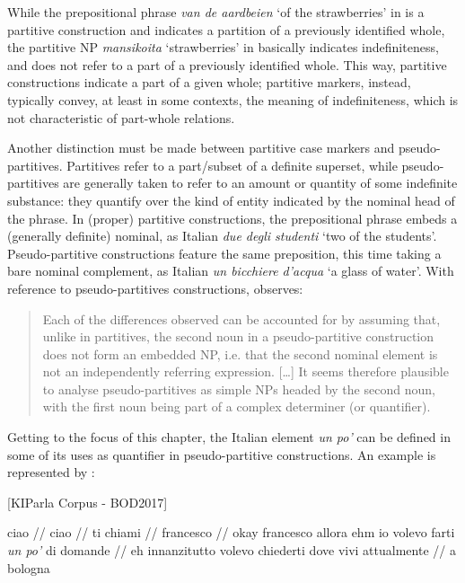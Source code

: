 While the prepositional phrase \textit{van de aardbeien} ‘of the strawberries’ in  is a partitive construction and indicates a partition of a previously identified whole, the partitive NP \textit{mansikoita} ‘strawberries’ in  basically indicates indefiniteness, and does not refer to a part of a previously identified whole. This way, partitive constructions indicate a part of a given whole; partitive markers, instead, typically convey, at least in some contexts, the meaning of indefiniteness, which is not characteristic of part-whole relations.

Another distinction must be made between partitive case markers and pseudo-partitives. Partitives refer to a part/subset of a definite superset, while pseudo-partitives are generally taken to refer to an amount or quantity of some indefinite substance: they quantify over the kind of entity indicated by the nominal head of the phrase. In (proper) partitive constructions, the prepositional phrase embeds a (generally definite) nominal, as Italian \textit{due degli studenti} ‘two of the students’. Pseudo-partitive constructions feature the same preposition, this time taking a bare nominal complement, as Italian \textit{un bicchiere d’acqua} ‘a glass of water’. With reference to pseudo-partitives constructions, \citet{Keizer2007} observes:

\begin{quote}
Each of the differences observed can be accounted for by assuming that, unlike in partitives, the second noun in a pseudo-partitive construction does not form an embedded NP, i.e. that the second nominal element is not an independently referring expression. […] It seems therefore plausible to analyse pseudo-partitives as simple NPs headed by the second noun, with the first noun being part of a complex determiner (or quantifier). \citep[111]{Keizer2007}
\end{quote}

Getting to the focus of this chapter, the Italian element \textit{un po’} can be defined in some of its uses as quantifier in pseudo-partitive constructions. An example is represented by :

\ea%
    \label{ex:key:53}

          [KIParla Corpus - BOD2017]

ciao // ciao // ti chiami // francesco // okay francesco allora ehm io volevo farti \textit{un po’} di domande // eh innanzitutto volevo chiederti dove vivi attualmente // a bologna

